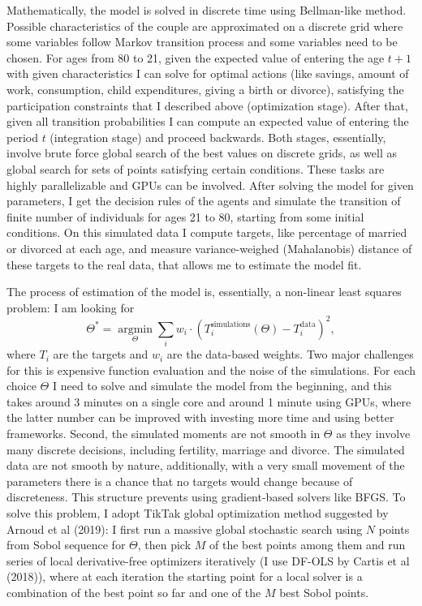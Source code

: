 \documentclass[11pt,letter]{article}
\DeclareMathOperator*{\argmin}{\mathrm{argmin}}
\begin{document}
Mathematically, the model is solved in discrete time using Bellman-like method. Possible characteristics of the couple are approximated on a discrete grid where some variables follow Markov transition process and some variables need to be chosen. For ages from 80 to 21, given the expected value of entering the age $t+1$ with given characteristics I can solve for optimal actions (like savings, amount of work, consumption, child expenditures, giving a birth or divorce), satisfying the participation constraints that I described above (optimization stage). After that, given all transition probabilities I can compute an expected value of entering the period $t$ (integration stage) and proceed backwards. Both stages, essentially, involve brute force global search of the best values on discrete grids, as well as global search for sets of points satisfying certain conditions. These tasks are highly parallelizable and GPUs can be involved. After solving the model for given parameters, I get the decision rules of the agents and simulate the transition of finite number of individuals for ages 21 to 80, starting from some initial conditions. On this simulated data I compute targets, like percentage of married or divorced at each age, and measure variance-weighed (Mahalanobis) distance of these targets to the real data, that allows me to estimate the model fit. 

The process of estimation of the model is, essentially, a non-linear least squares problem: I am looking for \[\Theta^* = \argmin\limits_\Theta \sum\limits_i w_i\cdot (T_i^{\text{simulations}}(\Theta) - T_i^{\text{data}})^2,\]
where $T_i$ are the targets and $w_i$ are the data-based weights. Two major challenges for this is expensive function evaluation and the noise of the simulations. For each choice $\Theta$ I need to solve and simulate the model from the beginning, and this takes around 3 minutes on a single core and around 1 minute using GPUs, where the latter number can be improved with investing more time and using better frameworks. Second, the simulated moments are not smooth in $\Theta$ as they involve many discrete decisions, including fertility, marriage and divorce. The simulated data are not smooth by nature, additionally, with a very small movement of the parameters there is a chance that no targets would change because of discreteness. This structure prevents using gradient-based solvers like BFGS. To solve this problem, I adopt TikTak global optimization method suggested by \nocite{benchmarking}Arnoud et al (2019): I first run a massive global stochastic search using $N$ points from Sobol sequence for $\Theta$, then pick $M$ of the best points among them and run series of local derivative-free optimizers iteratively (I use DF-OLS by \nocite{dfols}Cartis et al (2018)), where at each iteration the starting point for a local solver is a combination of the best point so far and one of the $M$ best Sobol points.
\end{document}
